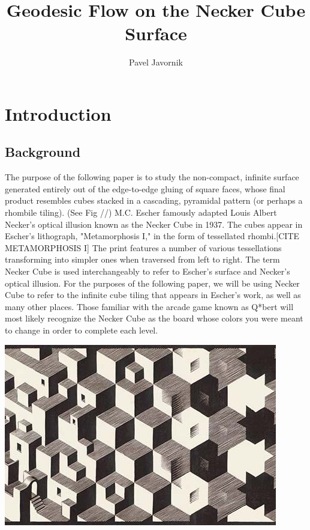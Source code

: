 \documentclass[]{article}
\title{Geodesic Flow on the Necker Cube Surface}
\date{}
\author{Pavel Javornik}
\begin{document}
\maketitle

\begin{center}

\end{center}

\begin{abstract}

\end{abstract}

\section{Introduction}

\subsection{Background}
The purpose of the following paper is to study the non-compact, infinite surface generated entirely out of the edge-to-edge gluing of square faces, whose final product resembles cubes stacked in a cascading, pyramidal pattern (or perhaps a rhombile tiling). (See Fig //) M.C. Escher famously adapted Louis Albert Necker's optical illusion known as the Necker Cube in 1937. The cubes appear in Escher's lithograph, "Metamorphosis I," in the form of tessellated rhombi.[CITE METAMORPHOSIS I] The print features a number of various tessellations transforming into simpler ones when traversed from left to right. The term Necker Cube is used interchangeably to refer to Escher's surface and Necker's optical illusion. For the purposes of the following paper, we will be using Necker Cube to refer to the infinite cube tiling that appears in Escher's work, as well as many other places. Those familiar with the arcade game known as Q*bert will most likely recognize the Necker Cube as the board whose colors you were meant to change in order to complete each level.

\begin{center}
\includegraphics[scale=0.5]{escher.jpg}
\\ 
\end{center}
\end{document}

